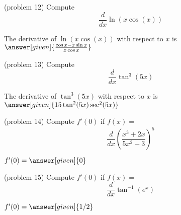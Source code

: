 \documentclass{ximera}
\begin{document}
\begin{problem}(problem 12)
  Compute
  \[
  \frac{d}{dx} \ln(x\cos (x))
  \]
  
    
		The derivative of $\ln(x\cos (x))$ with respect to $x$ is
		 $\answer[given]{\frac{\cos x - x\sin x}{x\cos x}}$
		
\end{problem}



\begin{problem}(problem 13)
  Compute
  \[
  \frac{d}{dx} \tan^3(5x)
  \]
  
   
		The derivative of $\tan^3(5x)$ with respect to $x$ is
		 $\answer[given]{15\tan^2(5x)\sec^2(5x)}$
		
\end{problem}



\begin{problem}(problem 14)
  Compute $f'(0)$ if $f(x)=$
  \[
  \frac{d}{dx} \left(\frac{x^3 + 2x}{5x^2 -3}\right)^5
  \]
  
 
		 $f'(0) = \answer[given]{0}$
		
\end{problem}



\begin{problem}(problem 15)
  Compute $f'(0)$ if $f(x)=$
  \[
  \frac{d}{dx} \tan^{-1}(e^x)
  \]
  
 
		 $f'(0) = \answer[given]{1/2}$
		
\end{problem}
\end{document}
